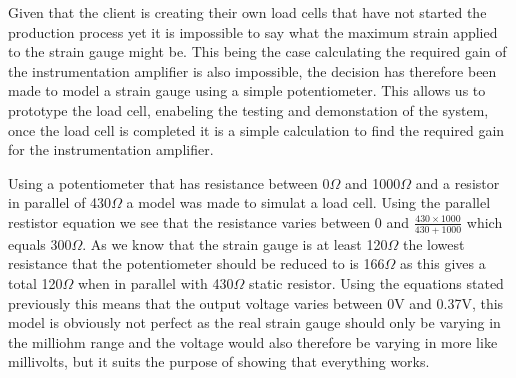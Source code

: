 Given that the client is creating their own load cells that have not started the production process yet it is impossible to say what the maximum strain applied to the strain gauge might be. This being the case calculating the required gain of the instrumentation amplifier is also impossible, the decision has therefore been made to model a strain gauge using a simple potentiometer. This allows us to prototype the load cell, enabeling the testing and demonstation of the system, once the load cell is completed it is a simple calculation to find the required gain for the instrumentation amplifier. 

Using a potentiometer that has resistance between 0\(\Omega\) and 1000\(\Omega\) and a resistor in parallel of 430\(\Omega\) a model was made to simulat a load cell. Using the parallel restistor equation we see that the resistance varies between 0 and \(\frac{430 \times 1000}{430 + 1000}\)  which equals 300\(\Omega\). As we know that the strain gauge is at least 120\(\Omega\) the lowest resistance that the potentiometer should be reduced to is 166\(\Omega\) as this gives a total 120\(\Omega\) when in parallel with 430\(\Omega\) static resistor. Using the equations stated previously this means that the output voltage varies between 0V and 0.37V, this model is obviously not perfect as the real strain gauge should only be varying in the milliohm range and the voltage would also therefore be varying in more like millivolts, but it suits the purpose of showing that everything works. 